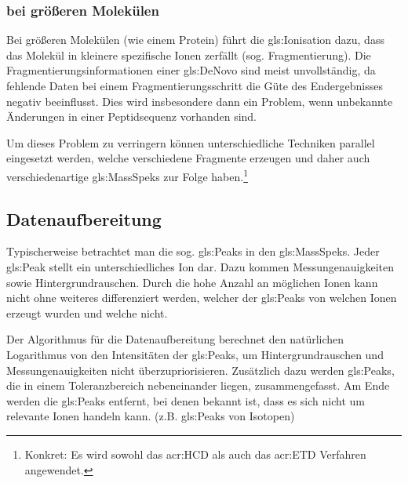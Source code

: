 \documentclass[a4paper, 12pt]{article}
\newcommand{\gerquot}[1]{\glqq#1\grqq}
\newcommand{\dashAndSpace}{\textendash \space}
\begin{document}


\subsubsection{ bei größeren Molekülen}
Bei größeren Molekülen (wie einem Protein) führt die \gls{gls:Ionisation} dazu, dass das Molekül in kleinere spezifische Ionen zerfällt (sog. Fragmentierung). Die Fragmentierungsinformationen einer \gls{gls:DeNovo} sind meist unvollständig, da fehlende Daten bei einem Fragmentierungsschritt die Güte des Endergebnisses negativ beeinflusst. Dies wird insbesondere dann ein Problem, wenn unbekannte Änderungen in einer Peptidsequenz vorhanden sind.

Um dieses Problem zu verringern können unterschiedliche Techniken parallel eingesetzt werden, welche verschiedene Fragmente erzeugen und daher auch verschiedenartige \glspl{gls:MassSpek} zur Folge haben.\footnote{Konkret: Es wird sowohl das \gls{acr:HCD} als auch das \gls{acr:ETD} Verfahren angewendet.}

\subsection{Datenaufbereitung}
Typischerweise betrachtet man die sog. \gerquot{\glspl{gls:Peak}} in den \glspl{gls:MassSpek}. Jeder \gls{gls:Peak} stellt ein unterschiedliches Ion dar. Dazu kommen Messungenauigkeiten sowie Hintergrundrauschen. Durch die hohe Anzahl an möglichen Ionen kann nicht ohne weiteres differenziert werden, welcher der \glspl{gls:Peak} von welchen Ionen erzeugt wurden und welche nicht.

Der Algorithmus für die Datenaufbereitung berechnet den natürlichen Logarithmus von den Intensitäten der \glspl{gls:Peak}, um Hintergrundrauschen und Messungenauigkeiten nicht überzupriorisieren. Zusätzlich dazu werden \glspl{gls:Peak}, die in einem Toleranzbereich nebeneinander liegen, zusammengefasst. Am Ende werden die \glspl{gls:Peak} entfernt, bei denen bekannt ist, dass es sich nicht um relevante Ionen handeln kann. (z.B. \glspl{gls:Peak} von Isotopen)
\end{document}
